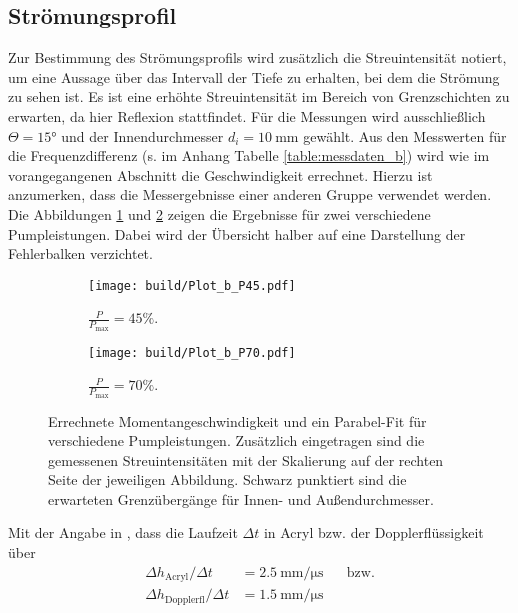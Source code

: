 \subsection{Strömungsprofil}
Zur Bestimmung des Strömungsprofils wird zusätzlich die Streuintensität notiert, um eine Aussage über das Intervall der Tiefe zu erhalten, bei dem die Strömung zu sehen ist. Es ist eine erhöhte Streuintensität im Bereich von Grenzschichten zu erwarten, da hier Reflexion stattfindet. Für die Messungen wird ausschließlich $\Theta = 15°$ und der Innendurchmesser $d_i = \SI{10}{\milli\meter}$ gewählt.
Aus den Messwerten für die Frequenzdifferenz (s. im Anhang Tabelle \ref{table:messdaten_b}) wird wie im vorangegangenen Abschnitt die Geschwindigkeit errechnet. Hierzu ist anzumerken, dass die Messergebnisse einer anderen Gruppe verwendet werden. Die Abbildungen \ref{fig:PlotA1} und \ref{fig:PlotA2} zeigen die Ergebnisse für zwei verschiedene Pumpleistungen. Dabei wird der Übersicht halber auf eine Darstellung der Fehlerbalken verzichtet.
\begin{figure*}
    \centering
    \begin{subfigure}[b]{0.475\textwidth}
        \centering
        \texttt{[image: build/Plot\_b\_P45.pdf]}
        \caption[]%
        {{\small $\frac{P}{P_\text{max}} = 45\si{\percent}$.}}
        \label{fig:PlotA1}
    \end{subfigure}
    \hfill
    \begin{subfigure}[b]{0.475\textwidth}
        \centering
        \texttt{[image: build/Plot\_b\_P70.pdf]}
        \caption[]%
        {{\small $\frac{P}{P_\text{max}} = 70\si{\percent}$.}}
        \label{fig:PlotA2}
    \end{subfigure}
    \caption[]
    {Errechnete Momentangeschwindigkeit und ein Parabel-Fit für verschiedene Pumpleistungen. Zusätzlich eingetragen sind die gemessenen Streuintensitäten mit der Skalierung auf der rechten Seite der jeweiligen Abbildung. Schwarz punktiert sind die erwarteten Grenzübergänge für Innen- und Außendurchmesser.}
    \label{fig:profil}
\end{figure*}
Mit der Angabe in \cite{skript}, dass die Laufzeit $\Delta t$ in Acryl bzw. der Dopplerflüssigkeit über
\begin{align}
  \Delta h_\text{Acryl} / \Delta t &= \SI{2,5}{\milli\meter\per\micro\second}   \;\;\;\;\;\; \text{bzw.} \label{eq:deltah_prisma} \\
  \Delta h_\text{Dopplerfl} / \Delta t &= \SI{1,5}{\milli\meter\per\micro\second}
  \label{eq:deltah_dopp}
\end{align}
